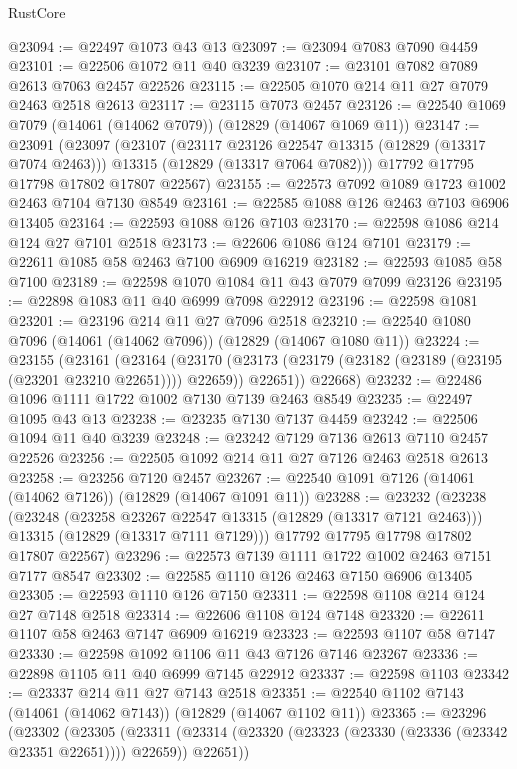 \begin{lexlean}{RustCore}
\begin{coremodule}
@23094 := @22497 @1073 @43 @13
@23097 := @23094 @7083 @7090 @4459
@23101 := @22506 @1072 @11 @40 @3239
@23107 := @23101 @7082 @7089 @2613 @7063 @2457 @22526
@23115 := @22505 @1070 @214 @11 @27 @7079 @2463 @2518 @2613
@23117 := @23115 @7073 @2457
@23126 := @22540 @1069 @7079 (@14061 (@14062 @7079)) (@12829 (@14067 @1069 @11))
@23147 := @23091
    (@23097
      (@23107
        (@23117 @23126 @22547 @13315 (@12829 (@13317 @7074 @2463)))
        @13315
        (@12829 (@13317 @7064 @7082)))
      @17792
      @17795
      @17798
      @17802
      @17807
      @22567)
@23155 := @22573 @7092 @1089 @1723 @1002 @2463 @7104 @7130 @8549
@23161 := @22585 @1088 @126 @2463 @7103 @6906 @13405
@23164 := @22593 @1088 @126 @7103
@23170 := @22598 @1086 @214 @124 @27 @7101 @2518
@23173 := @22606 @1086 @124 @7101
@23179 := @22611 @1085 @58 @2463 @7100 @6909 @16219
@23182 := @22593 @1085 @58 @7100
@23189 := @22598 @1070 @1084 @11 @43 @7079 @7099 @23126
@23195 := @22898 @1083 @11 @40 @6999 @7098 @22912
@23196 := @22598 @1081
@23201 := @23196 @214 @11 @27 @7096 @2518
@23210 := @22540 @1080 @7096 (@14061 (@14062 @7096)) (@12829 (@14067 @1080 @11))
@23224 := @23155
    (@23161
      (@23164
        (@23170 (@23173 (@23179 (@23182 (@23189 (@23195 (@23201 @23210 @22651)))) @22659)) @22651))
      @22668)
@23232 := @22486 @1096 @1111 @1722 @1002 @7130 @7139 @2463 @8549
@23235 := @22497 @1095 @43 @13
@23238 := @23235 @7130 @7137 @4459
@23242 := @22506 @1094 @11 @40 @3239
@23248 := @23242 @7129 @7136 @2613 @7110 @2457 @22526
@23256 := @22505 @1092 @214 @11 @27 @7126 @2463 @2518 @2613
@23258 := @23256 @7120 @2457
@23267 := @22540 @1091 @7126 (@14061 (@14062 @7126)) (@12829 (@14067 @1091 @11))
@23288 := @23232
    (@23238
      (@23248
        (@23258 @23267 @22547 @13315 (@12829 (@13317 @7121 @2463)))
        @13315
        (@12829 (@13317 @7111 @7129)))
      @17792
      @17795
      @17798
      @17802
      @17807
      @22567)
@23296 := @22573 @7139 @1111 @1722 @1002 @2463 @7151 @7177 @8547
@23302 := @22585 @1110 @126 @2463 @7150 @6906 @13405
@23305 := @22593 @1110 @126 @7150
@23311 := @22598 @1108 @214 @124 @27 @7148 @2518
@23314 := @22606 @1108 @124 @7148
@23320 := @22611 @1107 @58 @2463 @7147 @6909 @16219
@23323 := @22593 @1107 @58 @7147
@23330 := @22598 @1092 @1106 @11 @43 @7126 @7146 @23267
@23336 := @22898 @1105 @11 @40 @6999 @7145 @22912
@23337 := @22598 @1103
@23342 := @23337 @214 @11 @27 @7143 @2518
@23351 := @22540 @1102 @7143 (@14061 (@14062 @7143)) (@12829 (@14067 @1102 @11))
@23365 := @23296
    (@23302
      (@23305
        (@23311 (@23314 (@23320 (@23323 (@23330 (@23336 (@23342 @23351 @22651)))) @22659)) @22651))

\end{coremodule}
\end{lexlean}
